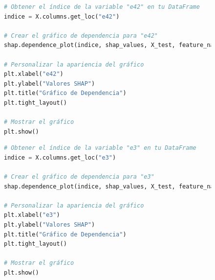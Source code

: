 \begin{figure}[ht]
    \centering
    \begin{minipage}{0.48\textwidth}
        \begin{lstlisting}[language=Python, caption=Grafico de dependencia e42, label=lst:grafDepe42]
# Obtener el índice de la variable "e42" en tu DataFrame
indice = X.columns.get_loc("e42")

# Crear el gráfico de dependencia para "e42"
shap.dependence_plot(indice, shap_values, X_test, feature_names=X.columns, show=False)

# Personalizar la apariencia del gráfico
plt.xlabel("e42")
plt.ylabel("Valores SHAP")
plt.title("Gráfico de Dependencia")
plt.tight_layout()

# Mostrar el gráfico
plt.show()
        \end{lstlisting}
    \end{minipage}
    \hfill
    \begin{minipage}{0.48\textwidth}
        \begin{lstlisting}[language=Python, caption=Grafico de dependencia e3, label=lst:grafDepe3]
# Obtener el índice de la variable "e3" en tu DataFrame
indice = X.columns.get_loc("e3")

# Crear el gráfico de dependencia para "e3"
shap.dependence_plot(indice, shap_values, X_test, feature_names=X.columns, show=False)

# Personalizar la apariencia del gráfico
plt.xlabel("e3")
plt.ylabel("Valores SHAP")
plt.title("Gráfico de Dependencia")
plt.tight_layout()

# Mostrar el gráfico
plt.show()
        \end{lstlisting}
    \end{minipage}
\end{figure}

